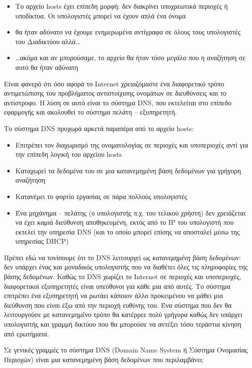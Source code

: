 \begin{itemize}
\item Το αρχείο hosts έχει επίπεδη μορφή: δεν διακρίνει υποχρεωτικά περιοχές ή υποδίκτυα. Οι υπολογιστές μπορεί να έχουν απλά ένα όνομα
\item θα ήταν αδύνατο να έχουμε ενημερωμένα αντίγραφα σε όλους τους υπολογιστές του Διαδικτύου αλλά\ldots
\item \ldots{}ακόμα και αν μπορούσαμε, το αρχείο θα ήταν τόσο μεγάλο που η αναζήτηση σε αυτό θα ήταν αδύνατη
\end{itemize}

Είναι φανερό ότι όσο αφορά το Internet χρειαζόμαστε ένα διαφορετικό τρόπο αντιμετώπισης του προβλήματος αντιστοίχισης ονομάτων σε διευθύνσεις και το αντίστροφο. Η λύση σε αυτό είναι το σύστημα DNS, που εκτελείται στο επίπεδο εφαρμογής και ακολουθεί το σύστημα πελάτη -- εξυπηρετητή.

Το σύστημα DNS προχωρά αρκετά παραπέρα από το αρχείο hosts:

\begin{itemize}
\item Επιτρέπει τον διαχωρισμό της ονοματολογίας σε περιοχές και υποπεριοχές αντί για την επίπεδη λογική του αρχείου hosts
\item Καταχωρεί τα δεδομένα του σε μια κατανεμημένη βάση δεδομένων για γρήγορη αναζήτηση
\item Κατανέμει το φορτίο εργασίας σε πάρα πολλούς υπολογιστές
\item Ένα μηχάνημα -- πελάτης (ο υπολογιστής π.χ. του τελικού χρήστη) δεν χρειάζεται να έχει καμιά διεύθυνση αποθηκευμένη, εκτός από το IP του υπολογιστή που εκτελεί την υπηρεσία DNS (και το οποίο μπορεί επίσης να αποσταλεί μέσω της υπηρεσίας DHCP)
\end{itemize}

Πρέπει εδώ να τονίσουμε ότι το DNS λειτουργεί ως \emph{κατανεμημένη} βάση δεδομένων: δεν υπάρχει ένας και μοναδικός υπολογιστής που να διαθέτει όλες τις πληροφορίες της βάσης δεδομένων. Καθώς το DNS χωρίζει το Internet σε περιοχές και υποπεριοχές, διαφορετικοί εξυπηρετητές είναι υπεύθυνοι για κάθε μια από αυτές. Το σύστημα επιτρέπει ένα εξυπηρετητή να ρωτάει κάποιον άλλο προκειμένου να μάθει μια διεύθυνση που είναι έξω από την περιοχή ευθύνης του. Ένα σύστημα που δεν θα λειτουργούσε με κατανεμημένο τρόπο θα κατέρρεε πολύ γρήγορα καθώς δεν υπάρχει υπολογιστής και γραμμή δικτύου που θα μπορούσε να αντέξει τόσο τεράστια κίνηση από ερωτήματα.

Σε γενικές γραμμές το σύστημα DNS (Domain Name System ή Σύστημα Ονομασίας Περιοχών) είναι μια κατανεμημένη βάση δεδομένων που περιλαμβάνει:

